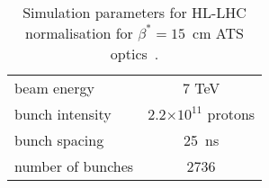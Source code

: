 \begin{table}%
   \centering
   \caption{Simulation parameters for HL-LHC normalisation for $\beta^* = 15$~cm ATS optics~\cite{ATSref}.}
   \begin{tabular}{l|c}
       \hline
       beam energy & 7 TeV \\
       bunch intensity & 2.2$\times 10^{11}$ protons\\
       bunch spacing & 25~ns \\
       number of bunches & 2736 \\
       \hline
   \end{tabular}
   \label{hlscenario}
\end{table}
